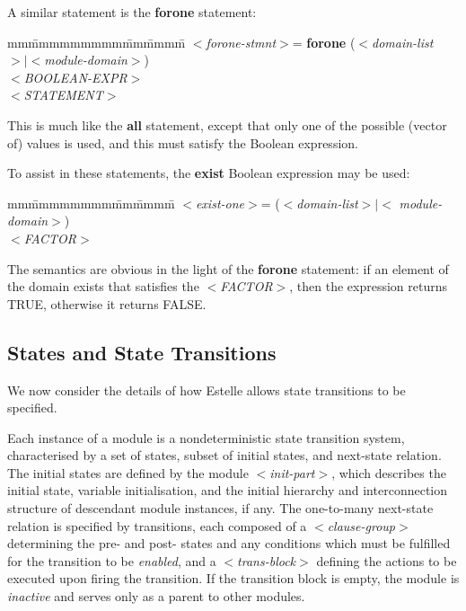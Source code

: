 A similar statement is the {\bf forone} statement:

\begin{tabbing}
mm\=mmmmmmmmm\=mm\=mmmm\=\+\kill
$<${\em forone-stmnt}$>$\>=\>
{\bf forone} ($<${\em domain-list}$>|<${\em module-domain}$>$)\\
\>\> $<${\em BOOLEAN-EXPR}$>$\\
\>\> $<${\em STATEMENT}$>$\\
\>\>
\end{tabbing}

This is much like the {\bf all} statement, except that only one
of the possible (vector of) values is used, and this must
satisfy the Boolean expression.
 
To assist in these statements, the {\bf exist} Boolean
expression may be used:

\begin{tabbing}
mm\=mmmmmmmm\=mm\=mmmm\=\+\kill
$<${\em exist-one}$>$\>= ($<${\em domain-list}$>|<${\em
module-domain}$>$)\\
\>\> $<${\em FACTOR}$>$\\
\end{tabbing}

The semantics are obvious in the light of the {\bf forone}
statement: if an element of the domain exists that satisfies
the $<${\em FACTOR}$>$, then the expression returns TRUE, otherwise it
returns FALSE.

\subsection[States and State Transitions]{States and State
Transitions}
\label{states}

We now consider the details of how Estelle allows state
transitions to be specified.
 
Each instance of a module is a nondeterministic state
transition system, characterised by a set of states, subset
of initial states, and next-state relation. The initial
states are defined by the module $<${\em init-part}$>$, which
describes the initial state, variable initialisation, and
the initial hierarchy and interconnection structure of
descendant module instances, if any. The one-to-many next-state
relation is specified by transitions, each composed of
a $<${\em clause-group}$>$ determining the pre- and post- states and
any conditions which must be fulfilled for the transition to
be {\em enabled}, and a $<${\em trans-block}$>$ defining the actions to be
executed upon firing the transition. If the transition
block is empty, the module is {\em inactive} and serves only as a
parent to other modules.


